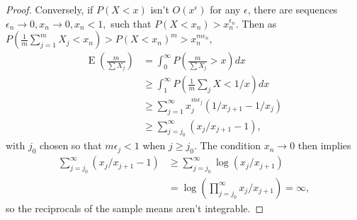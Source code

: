 \documentclass[12pt]{article}
\renewcommand{\P}{P}
\newcommand{\x}{X}
\DeclareMathOperator{\E}{E}
\begin{document}
\begin{proof}
    Conversely, if $\P(\x<x)$ isn't $O(x^\epsilon)$ for any $\epsilon$, there are sequences $\epsilon_n \to 0, x_n\to 0, x_n<1,$ such that $\P(\x<x_n)>x_n^{\epsilon_n}$. Then as $\P(\frac{1}{m}\sum_{j=1}^m\x_j < x_n) > \P(\x<x_n)^m > x_n^{m\epsilon_n}$,
    \begin{align}
      \E\left(\frac{m}{\sum \x_j}\right) &= \int_0^\infty \P\left(\frac{m}{\sum\x_j}>x\right)dx\\
                              &\ge \int_1^\infty \P\left(\frac{1}{m}\sum_j\x < 1/x\right)dx\\
                              &\ge \sum_{j=1}^\infty x_j^{m\epsilon_j}(1/x_{j+1}-1/x_j)\\
                              &\ge \sum_{j=j_0}^\infty (x_j/x_{j+1}-1),
    \end{align}
    with $j_0$ chosen so that $m\epsilon_j<1$ when $j\ge j_0$. The condition $x_n\to 0$ then implies
    \begin{align}
      \sum_{j=j_0}^\infty (x_j/x_{j+1}-1) &\ge \sum_{j=j_0}^\infty \log(x_j/x_{j+1})\\
                                        &=\log\left(\prod_{j=j_0}^\infty x_j/x_{j+1}\right)=\infty,
    \end{align}
    so the reciprocals of the sample means aren't integrable. %
  \end{proof}
\end{document}
